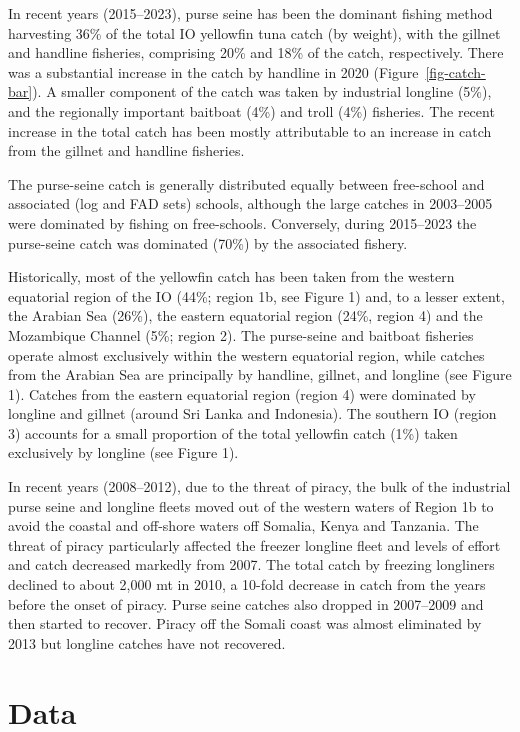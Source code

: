 \documentclass[
]{scrartcl}
\begin{document}
In recent years (2015--2023), purse seine has been the dominant fishing
method harvesting 36\% of the total IO yellowfin tuna catch (by weight),
with the gillnet and handline fisheries, comprising 20\% and 18\% of the
catch, respectively. There was a substantial increase in the catch by
handline in 2020 (Figure~\ref{fig-catch-bar}). A smaller component of
the catch was taken by industrial longline (5\%), and the regionally
important baitboat (4\%) and troll (4\%) fisheries. The recent increase
in the total catch has been mostly attributable to an increase in catch
from the gillnet and handline fisheries.

The purse-seine catch is generally distributed equally between
free-school and associated (log and FAD sets) schools, although the
large catches in 2003--2005 were dominated by fishing on free-schools.
Conversely, during 2015--2023 the purse-seine catch was dominated (70\%)
by the associated fishery.

Historically, most of the yellowfin catch has been taken from the
western equatorial region of the IO (44\%; region 1b, see Figure 1) and,
to a lesser extent, the Arabian Sea (26\%), the eastern equatorial
region (24\%, region 4) and the Mozambique Channel (5\%; region 2). The
purse-seine and baitboat fisheries operate almost exclusively within the
western equatorial region, while catches from the Arabian Sea are
principally by handline, gillnet, and longline (see Figure 1). Catches
from the eastern equatorial region (region 4) were dominated by longline
and gillnet (around Sri Lanka and Indonesia). The southern IO (region 3)
accounts for a small proportion of the total yellowfin catch (1\%) taken
exclusively by longline (see Figure 1).

In recent years (2008--2012), due to the threat of piracy, the bulk of
the industrial purse seine and longline fleets moved out of the western
waters of Region 1b to avoid the coastal and off-shore waters off
Somalia, Kenya and Tanzania. The threat of piracy particularly affected
the freezer longline fleet and levels of effort and catch decreased
markedly from 2007. The total catch by freezing longliners declined to
about 2,000 mt in 2010, a 10-fold decrease in catch from the years
before the onset of piracy. Purse seine catches also dropped in
2007--2009 and then started to recover. Piracy off the Somali coast was
almost eliminated by 2013 but longline catches have not recovered.

\section{Data}\label{data}
\end{document}
